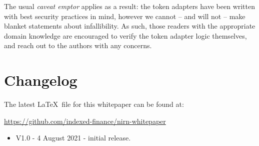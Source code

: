 \documentclass{article}
\begin{document}
\noindent
The usual \textit{caveat emptor} applies as a result: the token adapters have been written with best security practices in mind, however we cannot -- and will not -- make blanket statements about infallibility. As such, those readers with the appropriate domain knowledge are encouraged to verify the token adapter logic themselves, and reach out to the authors with any concerns.

\newpage
\section{Changelog}

The latest \LaTeX~file for this whitepaper can be found at:

\begin{center}
\url{https://github.com/indexed-finance/nirn-whitepaper}
\end{center}

\begin{itemize}
    \item V1.0 - 4 August 2021 - initial release.
\end{itemize}


\newpage

\end{document}
